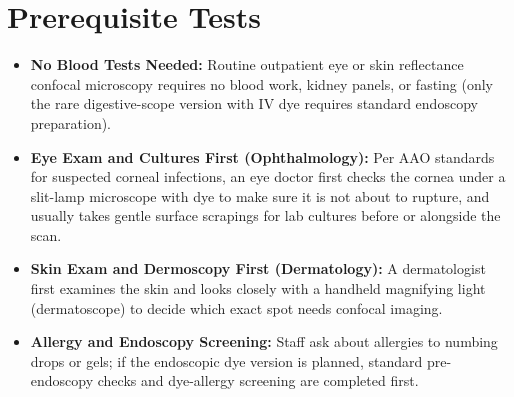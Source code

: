 \section{Prerequisite Tests}
\begin{itemize}
    \item \textbf{No Blood Tests Needed:} Routine outpatient eye or skin reflectance confocal microscopy requires no blood work, kidney panels, or fasting (only the rare digestive-scope version with IV dye requires standard endoscopy preparation).
    \item \textbf{Eye Exam and Cultures First (Ophthalmology):} Per AAO standards for suspected corneal infections, an eye doctor first checks the cornea under a slit-lamp microscope with dye to make sure it is not about to rupture, and usually takes gentle surface scrapings for lab cultures before or alongside the scan.
    \item \textbf{Skin Exam and Dermoscopy First (Dermatology):} A dermatologist first examines the skin and looks closely with a handheld magnifying light (dermatoscope) to decide which exact spot needs confocal imaging.
    \item \textbf{Allergy and Endoscopy Screening:} Staff ask about allergies to numbing drops or gels; if the endoscopic dye version is planned, standard pre-endoscopy checks and dye-allergy screening are completed first.
\end{itemize}


